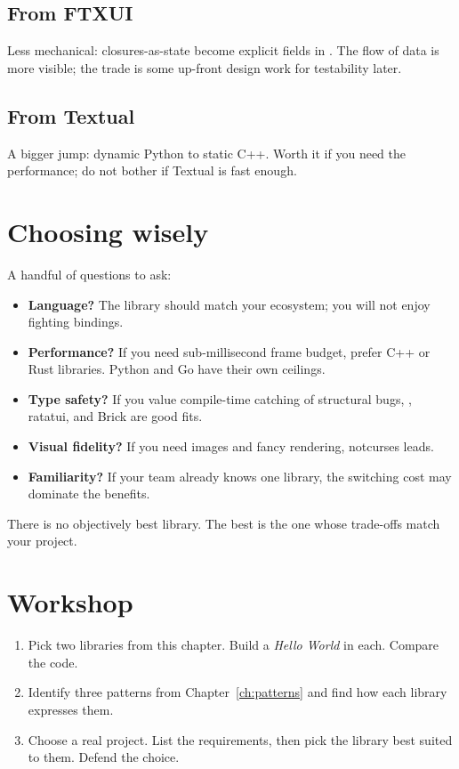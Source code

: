 \subsection*{From FTXUI}

Less mechanical: closures-as-state become explicit fields in
. The flow of data is more visible; the trade is
some up-front design work for testability later.

\subsection*{From Textual}

A bigger jump: dynamic Python to static C++. Worth it if you
need the performance; do not bother if Textual is fast enough.

\section{Choosing wisely}

A handful of questions to ask:

\begin{itemize}[leftmargin=*]
  \item \textbf{Language?} The library should match your
    ecosystem; you will not enjoy fighting bindings.
  \item \textbf{Performance?} If you need sub-millisecond
    frame budget, prefer C++ or Rust libraries. Python and
    Go have their own ceilings.
  \item \textbf{Type safety?} If you value compile-time
    catching of structural bugs, \maya{}, ratatui, and
    Brick are good fits.
  \item \textbf{Visual fidelity?} If you need images and
    fancy rendering, notcurses leads.
  \item \textbf{Familiarity?} If your team already knows one
    library, the switching cost may dominate the benefits.
\end{itemize}

There is no objectively best library. The best is the one
whose trade-offs match your project.

\section*{Workshop}

\begin{enumerate}[leftmargin=*]
  \item Pick two libraries from this chapter. Build a
    \emph{Hello World} in each. Compare the code.
  \item Identify three patterns from
    Chapter~\ref{ch:patterns} and find how each library
    expresses them.
  \item Choose a real project. List the requirements, then
    pick the library best suited to them. Defend the choice.
\end{enumerate}

